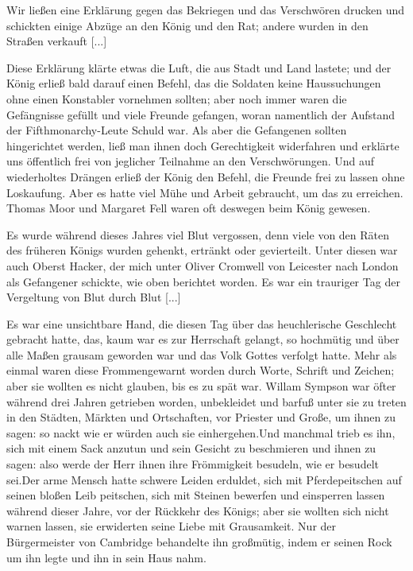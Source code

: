Wir ließen eine Erklärung gegen das Bekriegen und das
Verschwören drucken und schickten einige Abzüge an den König
und den Rat; andere wurden in den Straßen verkauft [...]

Diese Erklärung klärte etwas die Luft, die aus Stadt und
Land lastete; und der König erließ bald darauf einen Befehl,
das die Soldaten keine Haussuchungen ohne einen Konstabler
vornehmen sollten; aber noch immer waren die Gefängnisse gefüllt
und viele Freunde gefangen, woran namentlich der Aufstand der
Fifthmonarchy-Leute Schuld war. Als aber die Gefangenen
sollten hingerichtet werden, ließ man ihnen doch Gerechtigkeit 
widerfahren und erklärte uns öffentlich frei von jeglicher Teilnahme an
den Verschwörungen. Und auf wiederholtes Drängen erließ der
König den Befehl, die Freunde frei zu lassen ohne Loskaufung.
Aber es hatte viel Mühe und Arbeit gebraucht, um das zu
erreichen. Thomas Moor und Margaret Fell waren oft deswegen
beim König gewesen.

Es wurde während dieses Jahres viel Blut vergossen, denn
viele von den Räten des früheren Königs wurden gehenkt, ertränkt
oder gevierteilt. Unter diesen war auch Oberst Hacker, der mich
unter Oliver Cromwell von Leicester nach London als Gefangener
schickte, wie oben berichtet worden. Es war ein trauriger Tag
der Vergeltung von Blut durch Blut [...]

Es war eine unsichtbare Hand, die diesen Tag über das
heuchlerische Geschlecht gebracht hatte, das, kaum war es zur
Herrschaft gelangt, so hochmütig und über alle Maßen grausam
geworden war und das Volk Gottes verfolgt hatte.
Mehr als einmal waren diese \glqq Frommen\grqq gewarnt worden
durch Worte, Schrift und Zeichen; aber sie wollten es nicht
glauben, bis es zu spät war. Willam Sympson war öfter während
drei Jahren getrieben worden, unbekleidet und barfuß unter sie
zu treten in den Städten, Märkten und Ortschaften, vor Priester
und Große, um ihnen zu sagen: \glqq so nackt wie er würden auch sie
einhergehen.\grqq Und manchmal trieb es ihn, sich mit einem Sack
anzutun und sein Gesicht zu beschmieren und ihnen zu sagen:
\glqq also werde der Herr ihnen ihre Frömmigkeit besudeln, wie er
besudelt sei.\grqq Der arme Mensch hatte schwere Leiden erduldet,
sich mit Pferdepeitschen auf seinen bloßen Leib peitschen, sich mit
Steinen bewerfen und einsperren lassen während dieser Jahre, vor
der Rückkehr des Königs; aber sie wollten sich nicht warnen
lassen, sie erwiderten seine Liebe mit Grausamkeit. Nur der
Bürgermeister von Cambridge behandelte ihn großmütig, indem
er seinen Rock um ihn legte und ihn in sein Haus nahm.

